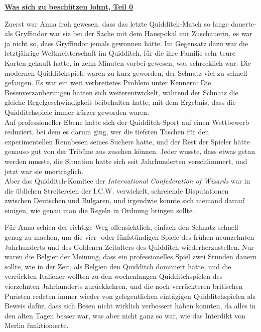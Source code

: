 

\hypertarget{was-sich-zu-beschuxfctzen-lohnt-teil-0}{%

\textbf{\uline{Was sich zu beschützen lohnt, Teil 0}}

Zuerst war Anna froh gewesen, dass das letzte Quidditch-Match so lange dauerte- als Gryffindor war sie bei der Sache mit dem Hauspokal nur Zuschauerin, es war ja nicht so, dass Gryffindor jemals gewonnen hätte. Im Gegensatz dazu war die letztjährige Weltmeisterschaft im Quidditch, für die ihre Familie sehr teure Karten gekauft hatte, in zehn Minuten vorbei gewesen, was schrecklich war. Die modernen Quidditchspiele waren zu kurz geworden, der Schnatz viel zu schnell gefangen. Es war ein weit verbreitetes Problem unter Kennern: Die Besenverzauberungen hatten sich weiterentwickelt, während der Schnatz die gleiche Regelgeschwindigkeit beibehalten hatte, mit dem Ergebnis, dass die Quidditchspiele immer kürzer geworden waren.\\ Auf professioneller Ebene hatte sich der Quidditch-Sport auf einen Wettbewerb reduziert, bei dem es darum ging, wer die tiefsten Taschen für den experimentellen Rennbesen seines Suchers hatte, und der Rest der Spieler hätte genauso gut von der Tribüne aus zusehen können. Jeder wusste, dass etwas getan werden musste, die Situation hatte sich seit Jahrhunderten verschlimmert, und jetzt war sie unerträglich.\\ Aber das Quidditch-Komitee der \emph{International Confederation of Wizards} war in die üblichen Streitereien der I.C.W. verwickelt, schreiende Disputationen zwischen Deutschen und Bulgaren, und irgendwie konnte sich niemand darauf einigen, wie genau man die Regeln in Ordnung bringen sollte.

Für Anna schien der richtige Weg offensichtlich, einfach den Schnatz schnell genug zu machen, um die vier- oder fünfstündigen Spiele des frühen neunzehnten Jahrhunderts und des Goldenen Zeitalters des Quidditch wiederherzustellen. Nur waren die Belgier der Meinung, dass ein professionelles Spiel zwei Stunden dauern sollte, wie in der Zeit, als Belgien den Quidditch dominiert hatte, und die verrückten Italiener wollten zu den wochenlangen Quidditchspielen des vierzehnten Jahrhunderts zurückkehren, und die noch verrückteren britischen Puristen redeten immer wieder von gelegentlichen eintägigen Quidditchspielen als Beweis dafür, dass sich Besen nicht wirklich verbessert haben konnten, da alles in den alten Tagen besser war, was aber nicht ganz so war, wie das Interdikt von Merlin funktionierte.

}

